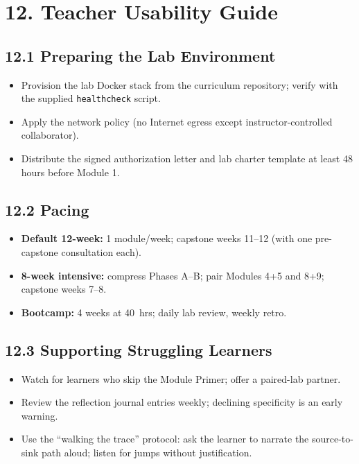 \documentclass[11pt,letterpaper,oneside]{report}
\newcommand{\tool}[1]{\texttt{\small #1}}
\begin{document}
\section*{12. Teacher Usability Guide}

\subsection*{12.1 Preparing the Lab Environment}
\begin{itemize}
  \item Provision the lab Docker stack from the curriculum repository; verify with the supplied \tool{healthcheck} script.
  \item Apply the network policy (no Internet egress except instructor-controlled collaborator).
  \item Distribute the signed authorization letter and lab charter template at least 48 hours before Module 1.
\end{itemize}

\subsection*{12.2 Pacing}
\begin{itemize}
  \item \textbf{Default 12-week:} 1 module/week; capstone weeks 11--12 (with one pre-capstone consultation each).
  \item \textbf{8-week intensive:} compress Phases A--B; pair Modules 4+5 and 8+9; capstone weeks 7--8.
  \item \textbf{Bootcamp:} 4 weeks at 40~hrs; daily lab review, weekly retro.
\end{itemize}

\subsection*{12.3 Supporting Struggling Learners}
\begin{itemize}
  \item Watch for learners who skip the Module Primer; offer a paired-lab partner.
  \item Review the reflection journal entries weekly; declining specificity is an early warning.
  \item Use the ``walking the trace'' protocol: ask the learner to narrate the source-to-sink path aloud; listen for jumps without justification.
\end{itemize}
\end{document}
